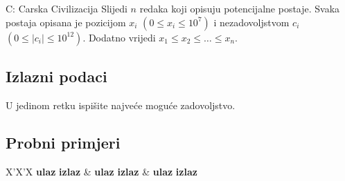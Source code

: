 \begin{statement}[
  timelimit=1 s,
  memorylimit=512 MiB,
]{C: Carska Civilizacija}
Slijedi $n$ redaka koji opisuju potencijalne postaje. Svaka postaja opisana je
pozicijom $x_i$ $(0 \le x_i \le 10^7)$ i nezadovoljstvom $c_i$ $(0 \le |c_i|
\le 10^{12})$. Dodatno vrijedi $x_1 \le x_2 \le \ldots \le x_n$.

\subsection*{Izlazni podaci}
U jedinom retku ispišite najveće moguće zadovoljstvo.

\subsection*{Probni primjeri}
\begin{tabularx}{\textwidth}{X'X'X}
  \textbf{ulaz}
  \linespread{1}{}
  \textbf{izlaz}
  \linespread{1}{} &
  \textbf{ulaz}
  \linespread{1}{}
  \textbf{izlaz}
  \linespread{1}{} &
  \textbf{ulaz}
  \linespread{1}{}
  \textbf{izlaz}
  \linespread{1}{}
\end{tabularx}

\end{statement}


